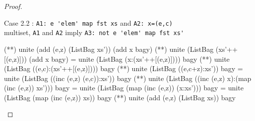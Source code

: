 \begin{proof}
\begin{code}
\end{code}
\hspace{1cm}Case 2.2 : \verb|A1: e 'elem' map fst xs| and \verb|A2: x=(e,c)|\\
multiset, \verb|A1| and \verb|A2| imply \verb|A3: not e 'elem' map fst xs'|
\begin{code}
             (**) unite (add (e,z) (ListBag xs')) (add x bagy)
             (**) unite (ListBag (xs'++[(e,z)])) (add x bagy)
             = unite (ListBag (x:(xs'++[(e,z)]))) bagy
             (**) unite (ListBag ((e,c):(xs'++[(e,z)]))) bagy
             (*\sEq{\ref{incLemma}}*) unite (ListBag ((e,c+z):xs')) bagy
             = unite (ListBag ((inc (e,z) (e,c)):xs')) bagy
             (*\sEq{\ref{mapLemma}}*) unite (ListBag ((inc (e,z) x):(map (inc (e,z)) xs'))) bagy
             = unite (ListBag (map (inc (e,z)) (x:xs'))) bagy
             = unite (ListBag (map (inc (e,z)) xs)) bagy
             (**) unite (add (e,z) (ListBag xs)) bagy
\end{code}
\end{proof}
\begin{comment}
\begin{lemma}{Associativity of \verb|unite|}
\begin{code}
unite (ListBag xs) (unite (ListBag ys) (ListBag zs))
          = unite (unite (ListBag xs) (ListBag ys)) (ListBag zs)
\end{code}
\end{lemma}
\begin{proof}by structural induction on xs\\
\verb|xs=[]|
\begin{code}
unite (ListBag xs) (unite (ListBag ys) (ListBag zs))
          = unite (ListBag []) (unite (ListBag ys) (ListBag zs))
          = unite (ListBag ys) (ListBag zs)
          = unite (unite (ListBag []) (ListBag ys)) (ListBag zs)
          = unite (unite (ListBag xs) (ListBag ys)) (ListBag zs)
\end{code}
\verb|xs=(x:xs')|
\begin{code}
unite (ListBag xs) (unite (ListBag ys) (ListBag zs))
          = unite (ListBag (x:xs')) (unite (ListBag ys) (ListBag zs))
          = unite (ListBag xs') (add x (unite (ListBag ys) (ListBag zs)))
          (*\sEq{\ref{addLemma}}*) unite (ListBag xs') (unite (add x (ListBag ys)) (ListBag zs))
          (*\sEq{IH}*) unite (unite (ListBag xs') (add x (ListBag ys))) (ListBag zs)
          = unite (unite (ListBag (x:xs')) (ListBag ys)) (ListBag zs)
          = unite (unite (ListBag xs) (ListBag ys)) (ListBag zs)
\end{code}
\end{proof}
\end{comment}
